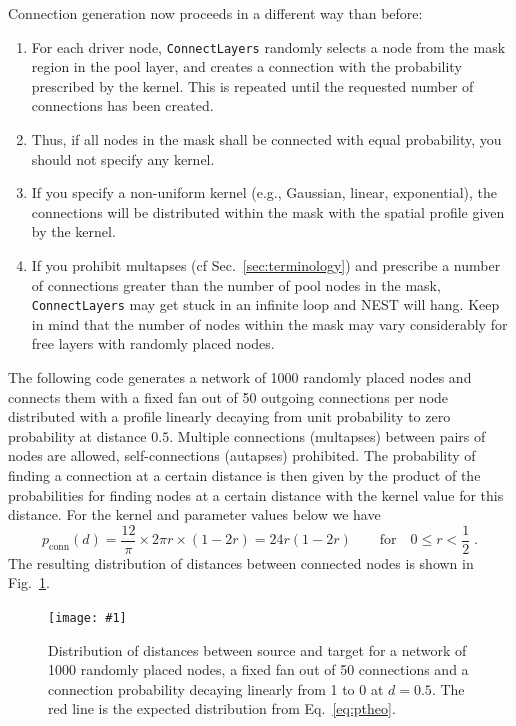 \documentclass[a4paper,12pt]{report}
\newcommand{\scriptfig}[4]{%
\begin{figure}
\centerline{\texttt{[image: \#1]}}
\caption[#3]{#4}
\label{fig:#1}
\end{figure}%
}
\begin{document}
Connection generation now proceeds in a different way than before:
\begin{enumerate}
\item For each driver node, \lstinline!ConnectLayers! randomly selects
  a node from the mask region in the pool layer, and creates a
  connection with the probability prescribed by the kernel. This is
  repeated until the requested number of connections has been created.
\item Thus, if all nodes in the mask shall be connected with equal
  probability, you should not specify any kernel.
\item If you specify a non-uniform kernel (e.g., Gaussian, linear,
  exponential), the connections will be distributed within the mask
  with the spatial profile given by the kernel.
\item If you prohibit multapses (cf Sec.~\ref{sec:terminology}) and
  prescribe a number of connections greater than the number of pool nodes
  in the mask, \lstinline!ConnectLayers! may get stuck in an infinite
  loop and NEST will hang. Keep in
  mind that the number of nodes within the mask may vary considerably
  for free layers with randomly placed nodes.
\end{enumerate}

The following code generates a network of 1000 randomly placed nodes
and connects them with a fixed fan out of 50 outgoing connections per
node distributed with a profile linearly decaying from unit
probability to zero probability at distance $0.5$. Multiple
connections (multapses) between pairs of nodes are allowed,
self-connections (autapses) prohibited. The probability of finding a
connection at a certain distance is then given by the product of the
probabilities for finding nodes at a certain distance with the kernel
value for this distance. For the kernel and parameter values below we have
\begin{equation}
p_{\text{conn}}(d) = \frac{12}{\pi} \times 2\pi r \times (1-2r)
 = 24 r (1-2r) \qquad \text{for} \quad 0\le r < \frac{1}{2}\;.
\label{eq:ptheo}
\end{equation}
 The resulting
distribution of distances between connected nodes is shown in
Fig.~\ref{fig:conn6}.

\scriptfig{conn6}{0.5}{Distribution of connection distances}%
{Distribution of distances between source and target for a network of
  1000 randomly placed nodes, a fixed fan out of 50 connections and a
  connection probability decaying linearly from 1 to 0 at
  $d=0.5$. The red line is the expected distribution from Eq.~\ref{eq:ptheo}.}
\end{document}
